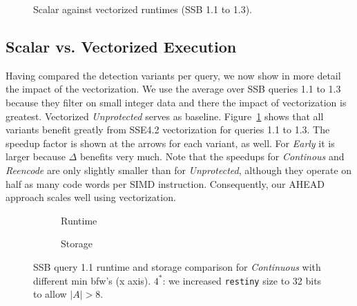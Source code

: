 \begin{figure}%
	\footnotesize
	\graphicspath{{results/ssb/}}
	\vspace{-1.5em}
	\caption{Scalar against vectorized runtimes (SSB 1.1 to 1.3).}%
	\label{fig:vectorVSscalar}%
	\vspace{-0.4cm}
\end{figure}





\subsection{Scalar vs. Vectorized Execution}
Having compared the detection variants per query, we now show in more detail the impact of the vectorization. We use the average over SSB queries 1.1 to 1.3 because they filter on small integer data and there the impact of vectorization is greatest. Vectorized \emph{Unprotected} serves as baseline. Figure~\ref{fig:vectorVSscalar} shows that all variants benefit greatly from SSE4.2 vectorization for queries 1.1 to 1.3. The speedup factor is shown at the arrows for each variant, as well. For \emph{Early} it is larger because \(\Delta\) benefits very much. Note that the speedups for \emph{Continous} and \emph{Reencode} are only slightly smaller than for \emph{Unprotected}, although they operate on half as many code words per SIMD instruction. Consequently, our AHEAD approach scales well using vectorization.

\begin{figure}%
	\footnotesize
	\graphicspath{{results/ssb/}}
	\null
	\begin{subfigure}{1.4in}
		\vspace{-0.5em}
		\caption{Runtime}
		\label{fig:minbfw:runtime}
	\end{subfigure}
	\hfill
	\begin{subfigure}{1.7in}
		\vspace{-0.5em}
		\caption{Storage}
		\label{fig:minbfw:storage}
	\end{subfigure}
	\null
	\vspace{-1.5em}
	\caption{SSB query 1.1 runtime and storage comparison for \emph{Continuous} with different min bfw's (x axis). $4^*$: we increased \texttt{restiny} size to 32 bits to allow \(|A|>8\).}%
	\label{fig:minbfw}%
	\vspace{-0.5cm}
\end{figure}





